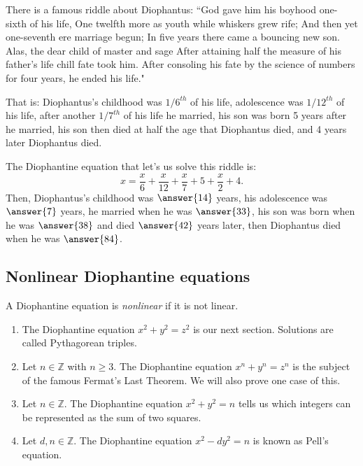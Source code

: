 \documentclass{ximera}
\begin{document}
\begin{example}
 There is a famous riddle about Diophantus: ``God gave him his boyhood one-sixth of his life, One twelfth more as youth while whiskers grew rife; And then yet one-seventh ere marriage begun; In five years there came a bouncing new son. Alas, the dear child of master and sage After attaining half the measure of his father's life chill fate took him. After consoling his fate by the science of numbers for four years, he ended his life." 
 
 That is: Diophantus's childhood was $1/6^{th}$ of his life, adolescence was $1/12^{th}$ of his life, after another $1/7^{th}$ of his life he married, his son was born 5 years after he married, his son then died at half the age that Diophantus died, and 4 years later Diophantus died.
 
The Diophantine equation that let's us solve this riddle is: \[x=\frac{x}{6}+\frac{x}{12}+\frac{x}{7}+5+\frac{x}{2}+4.\] Then, Diophantus's childhood was $\answer{14}$ years, his adolescence was $\answer{7}$ years, he married when he was $\answer{33}$, his son was born when he was $\answer{38}$ and died $\answer{42}$ years later, then Diophantus died when he was $\answer{84}$.
\end{example}

\subsection{Nonlinear Diophantine equations}
\begin{definition}
 A Diophantine equation is \emph{nonlinear} if it is not linear.
\end{definition}

\begin{example}
 
\begin{enumerate}
 \item The Diophantine equation $x^2+y^2=z^2$ is our next section. Solutions are called Pythagorean triples.
 \item Let $n\in\mathbb{Z}$ with $n\geq 3$. The Diophantine equation $x^n+y^n=z^n$ is the subject of the famous Fermat's Last Theorem. We will also prove one case of this.
 \item Let $n\in\mathbb{Z}$. The Diophantine equation $x^2+y^2=n$ tells us which integers can be represented as the sum of two squares.
 \item Let $d,n\in\mathbb{Z}$. The Diophantine equation $x^2-dy^2=n$ is known as Pell's equation.
\end{enumerate}
\end{example}
\end{document}

